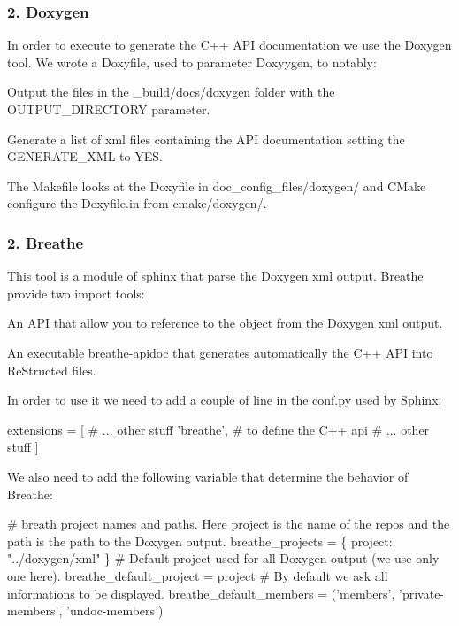 \subsubsection*{2. Doxygen}

In order to execute to generate the C++ A\+PI documentation we use the Doxygen tool. We wrote a {\ttfamily Doxyfile}, used to parameter Doxyygen, to notably\+:


\begin{DoxyItemize}
\item Output the files in the {\ttfamily \+\_\+build/docs/doxygen} folder with the {\ttfamily O\+U\+T\+P\+U\+T\+\_\+\+D\+I\+R\+E\+C\+T\+O\+RY} parameter.
\item Generate a list of xml files containing the A\+PI documentation setting the {\ttfamily G\+E\+N\+E\+R\+A\+T\+E\+\_\+\+X\+ML} to {\ttfamily Y\+ES}.
\end{DoxyItemize}

The Makefile looks at the {\ttfamily Doxyfile} in {\ttfamily doc\+\_\+config\+\_\+files/doxygen/} and C\+Make configure the {\ttfamily Doxyfile.\+in} from {\ttfamily cmake/doxygen/}.

\subsubsection*{2. Breathe}

This tool is a module of sphinx that parse the Doxygen xml output. Breathe provide two import tools\+:


\begin{DoxyItemize}
\item An A\+PI that allow you to reference to the object from the Doxygen xml output.
\item An executable {\ttfamily breathe-\/apidoc} that generates automatically the C++ A\+PI into Re\+Structed files.
\end{DoxyItemize}

In order to use it we need to add a couple of line in the {\ttfamily conf.\+py} used by Sphinx\+:


\begin{DoxyCode}
extensions = [
    # ... other stuff
    'breathe', # to define the C++ api
    # ... other stuff
]
\end{DoxyCode}


We also need to add the following variable that determine the behavior of Breathe\+:


\begin{DoxyCode}
# breath project names and paths. Here project is the name of the repos and the path is the path to the
       Doxygen output.
breathe\_projects = \{ project: "../doxygen/xml" \}
# Default project used for all Doxygen output (we use only one here).
breathe\_default\_project = project
# By default we ask all informations to be displayed.
breathe\_default\_members = ('members', 'private-members', 'undoc-members')
\end{DoxyCode}


